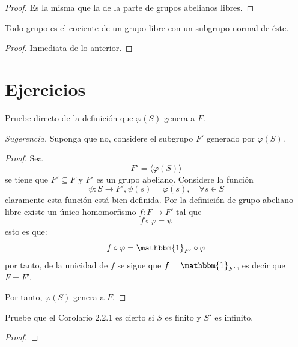 \documentclass[12pt]{report}
\newcounter{it}
\theoremstyle{largebreak}
\newcommand\cf[3]{\ensuremath{#1:#2\rightarrow#3}}
\newcommand{\bbm}[1]{\mathbbm{#1}}
\begin{document}
    \begin{proof}
        Es la misma que la de la parte de grupos abelianos libres.
    \end{proof}
    
    \begin{cor}
        Todo grupo es el cociente de un grupo libre con un subgrupo normal de éste.
    \end{cor}

    \begin{proof}
        Inmediata de lo anterior.
    \end{proof}

    \newpage

    \section{Ejercicios}

    \begin{excer}
        Pruebe directo de la definición que $\varphi(S)$ genera a $F$.

        \textit{Sugerencia.} Suponga que no, considere el subgrupo $F'$ generado por $\varphi(S)$.
    \end{excer}

    \begin{proof}
        Sea
        \begin{equation*}
            F'=\langle\varphi(S)\rangle
        \end{equation*}
        se tiene que $F'\subseteq F$ y $F'$ es un grupo abeliano. Considere la función
        \begin{equation*}
            \cf{\psi}{S}{F'},\psi(s)=\varphi(s),\quad\forall s\in S
        \end{equation*}
        claramente esta función está bien definida. Por la definición de grupo abeliano libre existe un único homomorfismo $\cf{f}{F}{F'}$ tal que
        \begin{equation*}
            f\circ\varphi=\psi
        \end{equation*}
        esto es que:
        \begin{equation*}
            f\circ\varphi=\bbm{1}_{F'}\circ\varphi
        \end{equation*}
        por tanto, de la unicidad de $f$ se sigue que $f=\bbm{1}_{F'}$, es decir que $F=F'$.

        Por tanto, $\varphi(S)$ genera a $F$.
    \end{proof}

    \begin{excer}
        Pruebe que el Corolario 2.2.1 es cierto si $S$ es finito y $S'$ es infinito.
    \end{excer}
    
    \begin{proof}
        
    \end{proof}

    
    \begin{excer}
        
    \end{excer}
\end{document}
